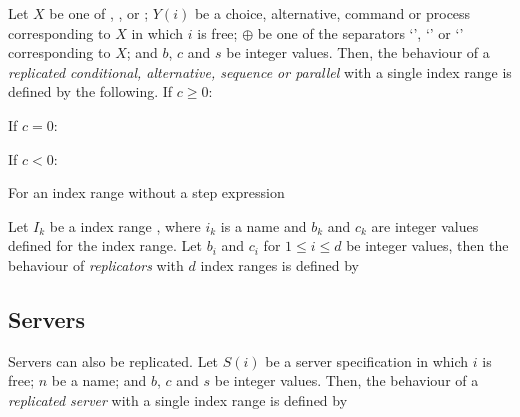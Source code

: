 \documentclass[11pt,a4paper,parskip=half-]{scrartcl}
\begin{document}
Let $X$ be one of , ,  or ;
%
$Y(i)$ be a choice, alternative, command or process corresponding to $X$ in
which $i$ is free;
%
$\oplus$ be one of the separators `\ttt{|}', `\ttt{;}' or `\ttt{\&}'
corresponding to $X$;
%
and $b$, $c$ and $s$ be integer values.
%
Then, the behaviour of a \emph{replicated conditional, alternative, sequence or
  parallel} with a single index range is defined by the following. If $c\geq0$:
%

\noindent 
If $c=0$:

\noindent
If $c<0$:

\noindent
For an index range without a step expression

\noindent
Let $I_k$ be a index range , where $i_k$ is a name
and $b_k$ and $c_k$ are integer values defined for the index range.
%
Let $b_i$ and $c_i$ for $1\leq i \leq d$ be integer values, then
the behaviour of \emph{replicators} with $d$ index ranges is defined by


\subsection{Servers}

Servers can also be replicated.
Let $S(i)$ be a server specification in which $i$ is free; $n$ be a name; and
$b$, $c$ and $s$ be integer values. Then, the behaviour of a \emph{replicated
server} with a single index range is defined by
\end{document}
